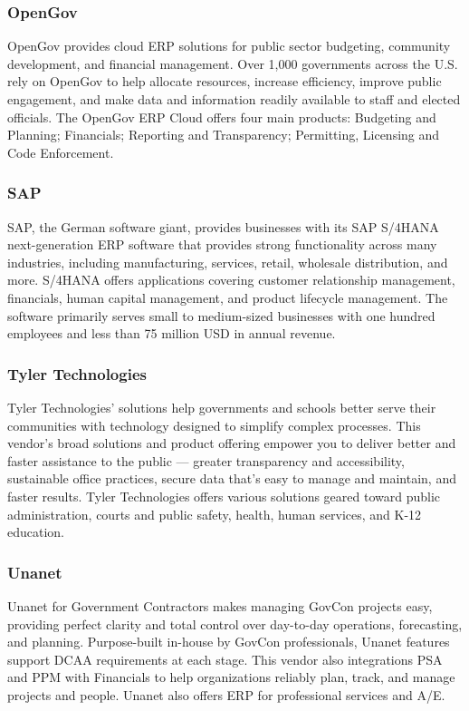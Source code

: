 \cite{Thompson2019}


\subsubsection*{OpenGov}
OpenGov provides cloud ERP solutions for public sector budgeting, community development, and financial management. Over 1,000 governments across the U.S. rely on OpenGov to help allocate resources, increase efficiency, improve public engagement, and make data and information readily available to staff and elected officials. The OpenGov ERP Cloud offers four main products: Budgeting and Planning; Financials; Reporting and Transparency; Permitting, Licensing and Code Enforcement.
\cite{Vasyl2021}

\subsubsection*{SAP}
SAP, the German software giant, provides businesses with its SAP S/4HANA next-generation ERP software that provides strong functionality across many industries, including manufacturing, services, retail, wholesale distribution, and more. S/4HANA offers applications covering customer relationship management, financials, human capital management, and product lifecycle management. The software primarily serves small to medium-sized businesses with one hundred employees and less than 75 million USD in annual revenue.


\subsubsection*{Tyler Technologies}

Tyler Technologies’ solutions help governments and schools better serve their communities with technology designed to simplify complex processes. This vendor’s broad solutions and product offering empower you to deliver better and faster assistance to the public — greater transparency and accessibility, sustainable office practices, secure data that’s easy to manage and maintain, and faster results. Tyler Technologies offers various solutions geared toward public administration, courts and public safety, health, human services, and K-12 education.

\subsubsection*{Unanet}
Unanet for Government Contractors makes managing GovCon projects easy, providing perfect clarity and total control over day-to-day operations, forecasting, and planning. Purpose-built in-house by GovCon professionals, Unanet features support DCAA requirements at each stage. This vendor also integrations PSA and PPM with Financials to help organizations reliably plan, track, and manage projects and people. Unanet also offers ERP for professional services and A/E.

